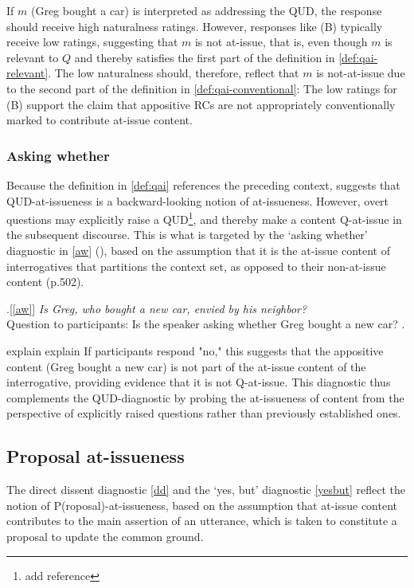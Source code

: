 \documentclass[times,linguex]{glossa}
\begin{document}
    If $m$ (Greg bought a car) is interpreted as addressing the QUD, the response should receive high naturalness ratings. However, responses like (B) typically receive low ratings, suggesting that $m$ is not at-issue, that is, even though $m$ is relevant to $Q$ and thereby satisfies the first part of the definition in \ref{def:qai-relevant}. The low naturalness should, therefore, reflect that $m$ is not-at-issue due to the second part of the definition in \ref{def:qai-conventional}: The low ratings for (B) support the claim that appositive RCs are not appropriately conventionally marked to contribute at-issue content.
    

    \subsubsection{Asking whether}
    Because the definition in \ref{def:qai} references the preceding context, \citet{koev_notions_2018} suggests that QUD-at-issueness is a backward-looking notion of at-issueness. However, overt questions may explicitly raise a QUD\footnote{add reference}, and thereby make a content Q-at-issue in the subsequent discourse. This is what is targeted by the `asking whether' diagnostic in \ref{aw} (\citealt{tonhauser_how_2018}), based on the assumption that it is the at-issue content of interrogatives that partitions the context set, as opposed to their non-at-issue content (p.502).

    \ex.[\ref{aw}]%
        \emph{Is Greg, who bought a new car, envied by his neighbor?}\smallskip
    \\ Question to participants: Is the speaker asking whether Greg bought a new car?
    \z.

    explain explain
    If participants respond "no," this suggests that the appositive content (Greg bought a new car) is not part of the at-issue content of the interrogative, providing evidence that it is not Q-at-issue. This diagnostic thus complements the QUD-diagnostic by probing the at-issueness of content from the perspective of explicitly raised questions rather than previously established ones.

  \subsection{Proposal at-issueness}
    The direct dissent diagnostic \ref{dd} and the `yes, but' diagnostic \ref{yesbut} reflect the notion of P(roposal)-at-issueness, based on the assumption that at-issue content contributes to the main assertion of an utterance, which is taken to constitute a proposal to update the common ground.
\end{document}
